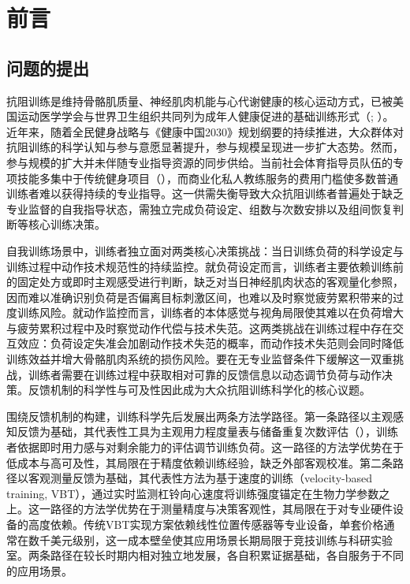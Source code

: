 
\chapter{前言}

\section{问题的提出}

抗阻训练是维持骨骼肌质量、神经肌肉机能与心代谢健康的核心运动方式，已被美国运动医学学会与世界卫生组织共同列为成年人健康促进的基础训练形式（\citep{ACSM2011}; \citep{WHO2020}）。近年来，随着全民健身战略与《健康中国2030》规划纲要的持续推进，大众群体对抗阻训练的科学认知与参与意愿显著提升，参与规模呈现进一步扩大态势。然而，参与规模的扩大并未伴随专业指导资源的同步供给。当前社会体育指导员队伍的专项技能多集中于传统健身项目（\citep{YangNan2025}），而商业化私人教练服务的费用门槛使多数普通训练者难以获得持续的专业指导。这一供需失衡导致大众抗阻训练者普遍处于缺乏专业监督的自我指导状态，需独立完成负荷设定、组数与次数安排以及组间恢复判断等核心训练决策。

自我训练场景中，训练者独立面对两类核心决策挑战：当日训练负荷的科学设定与训练过程中动作技术规范性的持续监控。就负荷设定而言，训练者主要依赖训练前的固定处方或即时主观感受进行判断，缺乏对当日神经肌肉状态的客观量化参照，因而难以准确识别负荷是否偏离目标刺激区间，也难以及时察觉疲劳累积带来的过度训练风险。就动作监控而言，训练者的本体感觉与视角局限使其难以在负荷增大与疲劳累积过程中及时察觉动作代偿与技术失范\citep{GwynneCurran2014}。这两类挑战在训练过程中存在交互效应：负荷设定失准会加剧动作技术失范的概率，而动作技术失范则会同时降低训练效益并增大骨骼肌肉系统的损伤风险。要在无专业监督条件下缓解这一双重挑战，训练者需要在训练过程中获取相对可靠的反馈信息以动态调节负荷与动作决策。反馈机制的科学性与可及性因此成为大众抗阻训练科学化的核心议题。

围绕反馈机制的构建，训练科学先后发展出两条方法学路径。第一条路径以主观感知反馈为基础，其代表性工具为主观用力程度量表\citep{Borg1982}与储备重复次数评估（\citep{Zourdos2016}），训练者依据即时用力感与对剩余能力的评估调节训练负荷。这一路径的方法学优势在于低成本与高可及性，其局限在于精度依赖训练经验，缺乏外部客观校准。第二条路径以客观测量反馈为基础，其代表性方法为基于速度的训练（velocity-based training, VBT），通过实时监测杠铃向心速度将训练强度锚定在生物力学参数之上\citep{GonzalezBadillo2010}。这一路径的方法学优势在于测量精度与决策客观性，其局限在于对专业硬件设备的高度依赖。传统VBT实现方案依赖线性位置传感器等专业设备，单套价格通常在数千美元级别，这一成本壁垒使其应用场景长期局限于竞技训练与科研实验室。两条路径在较长时期内相对独立地发展，各自积累证据基础，各自服务于不同的应用场景。


